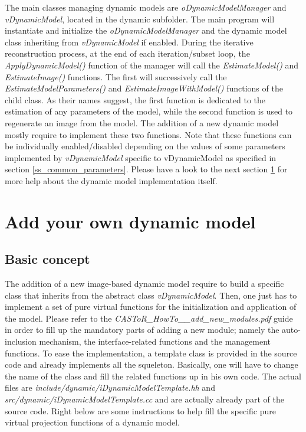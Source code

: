 \documentclass[a4paper, 11pt]{article}
\begin{document}
The main classes managing dynamic models are \textit{oDynamicModelManager} and \textit{vDynamicModel}, located in the dynamic subfolder. The main program will instantiate and initialize the \textit{oDynamicModelManager} and the dynamic model class inheriting from \textit{vDynamicModel} if enabled. During the iterative reconstruction process, at the end of each iteration/subset loop, the \textit{ApplyDynamicModel()} function of the manager will call the \textit{EstimateModel()} and \textit{EstimateImage()} functions. The first will successively call the \textit{EstimateModelParameters()} and \textit{EstimateImageWithModel()} functions of the child class. As their names suggest, the first function is dedicated to the estimation of any parameters of the model, while the second function is used to regenerate an image from the model. The addition of a new dynamic model mostly require to implement these two functions. Note that these functions can be individually enabled/disabled depending on the values of some parameters implemented by \textit{vDynamicModel} specific to vDynamicModel as specified in section \ref{ss_common_parameters}. Please have a look to the next section \ref{section_add_own_dynamic_model} for more help about the dynamic model implementation itself.




\clearpage
\section{Add your own dynamic model}
\label{section_add_own_dynamic_model}

\subsection{Basic concept}

The addition of a new image-based dynamic model require to build a specific class that inherits from the abstract class \textit{vDynamicModel}. Then, one just has to implement a set of pure virtual functions for the initialization and application of the model. Please refer to the \textit{CASToR\_HowTo\_\_add\_new\_modules.pdf} guide in order to fill up the mandatory parts of adding a new module; namely the auto-inclusion mechanism, the interface-related functions and the management functions. To ease the implementation, a template class is provided in the source code and already implements all the squeleton. Basically, one will have to change the name of the class and fill the related functions up in his own code. The actual files are \textit{include/dynamic/iDynamicModelTemplate.hh} and \textit{src/dynamic/iDynamicModelTemplate.cc} and are actually already part of the source code. Right below are some instructions to help fill the specific pure virtual projection functions of a dynamic model.
\bigskip
\end{document}
